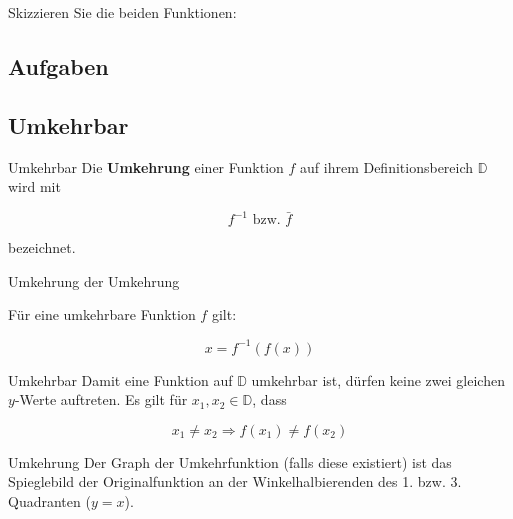 Skizzieren Sie die beiden Funktionen:

\newpage


\subsection{Aufgaben}



\newpage


\subsection{Umkehrbar}
\begin{definition}{Umkehrbar}{}
Die \textbf{Umkehrung} einer Funktion $f$ auf ihrem Definitionsbereich
$\mathbb{D}$ wird mit

  $$f^{-1} \text{ bzw. } \bar{f}$$

bezeichnet.
\end{definition}

\begin{gesetz}{Umkehrung der Umkehrung}{}

  Für eine umkehrbare Funktion $f$ gilt:
  
  $$x= f^{-1}(f(x))$$
\end{gesetz}


\begin{gesetz}{Umkehrbar}{}
  Damit eine Funktion auf $\mathbb{D}$ umkehrbar ist, dürfen keine zwei
  gleichen $y$-Werte auftreten. Es gilt für $x_1,x_2\in\mathbb{D}$,
  dass
  
  $$x_1\ne x_2 \Longrightarrow f(x_1) \ne f(x_2)$$
\end{gesetz}

\begin{bemerkung}{Umkehrung}{}
 Der Graph der Umkehrfunktion (falls diese existiert) ist das
 Spieglebild der Originalfunktion 
 an der Winkelhalbierenden des 1. bzw. 3. Quadranten ($y=x$).
\end{bemerkung}
\newpage


